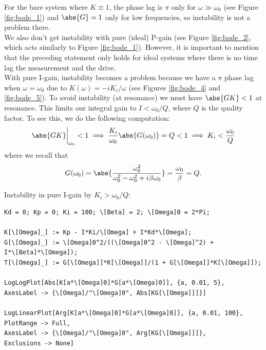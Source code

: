 \documentclass{article}
\theoremstyle{definition}
\newcommand{\f}[2]{\frac{#1}{#2}}
\begin{document}
\noindent For the bare system where $K\equiv 1$, the phase lag is $\pi$ only for $\omega \gg \omega_0$ (see Figure \ref{fig:bode_1}) and $\abs{G} = 1$ only for low frequencies,  so instability is not a problem there. \\


\noindent We also don't get instability with pure (ideal) P-gain (see Figure \ref{fig:bode_2}, which acts similarly to Figure \ref{fig:bode_1}). However, it is important to mention that the preceding statement only holds for ideal systems where there is no time lag the measurement and the drive. \\


\noindent With pure I-gain, instability becomes a problem because we have a $\pi$ phase lag when $\omega = \omega_0$ due to $K(\omega) = -iK_i/\omega$ (see Figures \ref{fig:bode_4} and \ref{fig:bode_5}). To avoid instability (at resonance) we must have $\abs{GK} < 1$ at resonance. This limits our integral gain to $I < \omega_0/Q$, where $Q$ is the quality factor. To see this, we do the following computation:
\begin{equation*}
\abs{GK}\bigg\vert_{\omega_0} < 1 \implies \f{K_i}{\omega_0} \abs{G(\omega_0)} = Q < 1 \implies  K_i < \f{\omega_0}{Q}
\end{equation*}
where we recall that 
\begin{equation*}
G(\omega_0) = \abs{\f{\omega_0^2}{\omega_0^2 - \omega_0^2 + i\beta \omega_0}} = \f{\omega_0}{\beta} = Q.
\end{equation*}


\noindent Instability in pure I-gain by $K_i > \omega_0/Q$:
\begin{lstlisting}
Kd = 0; Kp = 0; Ki = 100; \[Beta] = 2; \[Omega]0 = 2*Pi;

K[\[Omega]_] := Kp - I*Ki/\[Omega] + I*Kd*\[Omega]; 
G[\[Omega]_] := \[Omega]0^2/((\[Omega]0^2 - \[Omega]^2) + 
I*\[Beta]*\[Omega]); 
T[\[Omega]_] := G[\[Omega]]*K[\[Omega]]/(1 + G[\[Omega]]*K[\[Omega]]);

LogLogPlot[Abs[K[a*\[Omega]0]*G[a*\[Omega]0]], {a, 0.01, 5}, 
AxesLabel -> {\[Omega]/"\[Omega]0", Abs[KG[\[Omega]]]}]

LogLinearPlot[Arg[K[a*\[Omega]0]*G[a*\[Omega]0]], {a, 0.01, 100}, 
PlotRange -> Full, 
AxesLabel -> {\[Omega]/"\[Omega]0", Arg[KG[\[Omega]]]}, 
Exclusions -> None]
\end{lstlisting}
\end{document}
